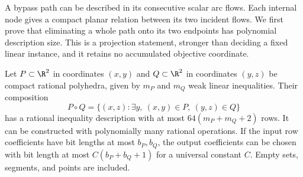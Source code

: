 A bypass path can be described in its consecutive scalar arc flows.
Each internal node gives a compact planar relation between its two
incident flows. We first prove that eliminating a whole path onto its
two endpoints has polynomial description size. This is a projection
statement, stronger than deciding a fixed linear instance, and it
retains no accumulated objective coordinate.

\begin{lemma}\label{s4:polygon-composition}
Let $P\subset\R^2$ in coordinates $(x,y)$ and $Q\subset\R^2$ in
coordinates $(y,z)$ be compact rational polyhedra, given by $m_P$ and
$m_Q$ weak linear inequalities. Their composition
\[
 P\circ Q=\{(x,z):\exists y,\ (x,y)\in P,\ (y,z)\in Q\}
\]
has a rational inequality description with at most
$64(m_P+m_Q+2)$ rows. It can be constructed with polynomially many
rational operations. If the input row coefficients have bit lengths
at most $b_P,b_Q$, the output coefficients can be chosen with bit
length at most $C(b_P+b_Q+1)$ for a universal constant $C$.
Empty sets, segments, and points are included.
\end{lemma}
